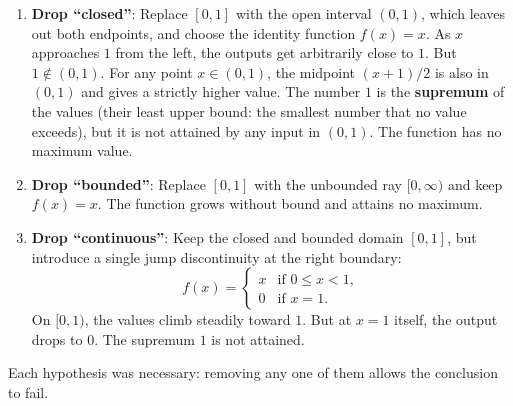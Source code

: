 \begin{enumerate}
\item \textbf{Drop ``closed''}: Replace $[0, 1]$ with the open interval $(0, 1)$, which leaves out both endpoints, and choose the identity function $f(x) = x$. As $x$ approaches $1$ from the left, the outputs get arbitrarily close to $1$. But $1 \notin (0, 1)$. For any point $x \in (0, 1)$, the midpoint $(x+1)/2$ is also in $(0, 1)$ and gives a strictly higher value. The number $1$ is the \textbf{supremum} of the values (their least upper bound: the smallest number that no value exceeds), but it is not attained by any input in $(0, 1)$. The function has no maximum value.
\item \textbf{Drop ``bounded''}: Replace $[0, 1]$ with the unbounded ray $[0, \infty)$ and keep $f(x) = x$. The function grows without bound and attains no maximum.
\item \textbf{Drop ``continuous''}: Keep the closed and bounded domain $[0, 1]$, but introduce a single jump discontinuity at the right boundary:
\[
f(x) = \begin{cases} x & \text{if } 0 \le x < 1, \\ 0 & \text{if } x = 1. \end{cases}
\]
On $[0, 1)$, the values climb steadily toward $1$. But at $x = 1$ itself, the output drops to $0$. The supremum $1$ is not attained.
\end{enumerate}

Each hypothesis was necessary: removing any one of them allows the conclusion to fail.

